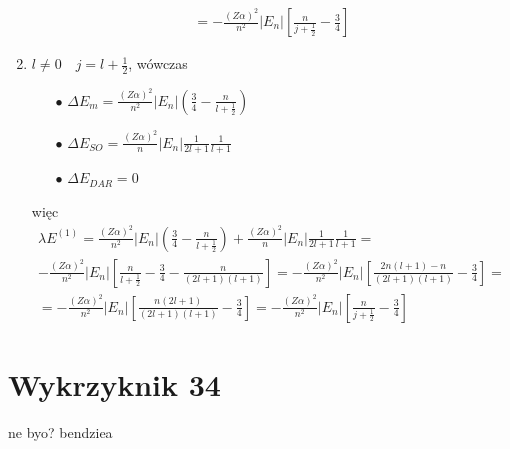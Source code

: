 \documentclass[a4paper,12pt]{article}
\begin{document}
\begin{enumerate}
$$\begin{gathered}
 					= -\frac{(Z\alpha)^2}{n^2}|E_n|\left[ \frac{n}{j+\frac{1}{2}} - \frac{3}{4}\right] 
 				\end{gathered}
 				$$
 			\item $ l\neq 0\quad j = l + \frac{1}{2}$, wówczas
 				\begin{itemize}
 					\item[$\bullet$]  $\Delta E_m = \frac{(Z\alpha)^2}{n^2}|E_n|\left(\frac{3}{4}  -\frac{n}{l+\frac{1}{2}}\right) $
 					\item[$\bullet$]  $\Delta E_{SO} = \frac{(Z\alpha)^2}{n}|E_n|\frac{1}{2l+1} \frac{1}{l+1}$
 					\item[$\bullet$]  $\Delta E_{DAR} = 0 $
 				\end{itemize}
 				więc
 				$$
 				\begin{gathered}
 					\lambda E^{(1)} =  \frac{(Z\alpha)^2}{n^2}|E_n|\left(\frac{3}{4}  -\frac{n}{l+\frac{1}{2}}\right) +  \frac{(Z\alpha)^2}{n}|E_n|\frac{1}{2l+1} \frac{1}{l+1} =\\ -\frac{(Z\alpha)^2}{n^2}|E_n| \left[  \frac{n}{l+\frac{1}{2}} - \frac{3}{4} - \frac{n}{(2l+1)(l+1)}  \right] =-\frac{(Z\alpha)^2}{n^2}|E_n|
 					  \left[ \frac{2n(l+1) - n}{(2l+1)(l+1)} - \frac{3}{4} \right] = \\
 					  =-\frac{(Z\alpha)^2}{n^2}|E_n|\left[ \frac{n(2l+1)}{(2l+1)(l+1)} - \frac{3}{4} \right] = -\frac{(Z\alpha)^2}{n^2}|E_n|\left[ \frac{n}{j+\frac{1}{2}} - \frac{3}{4} \right] 
 				\end{gathered}
 				$$
		 \end{enumerate}

\section{Wykrzyknik 34}
ne byo? bendziea
\end{document}
